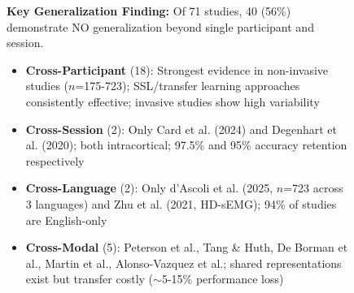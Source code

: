 \begin{figure}[h!]
\centering
{}

\vspace{1cm}

\centering
\footnotesize
\textbf{Key Generalization Finding:} Of 71 studies, 40 (56\%) demonstrate NO generalization beyond single participant and session.
\begin{itemize}
  \item \textbf{Cross-Participant} (18): Strongest evidence in non-invasive studies ($n$=175-723); SSL/transfer learning approaches consistently effective; invasive studies show high variability
  \item \textbf{Cross-Session} (2): Only Card et al. (2024) and Degenhart et al. (2020); both intracortical; 97.5\% and 95\% accuracy retention respectively
  \item \textbf{Cross-Language} (2): Only d'Ascoli et al. (2025, $n$=723 across 3 languages) and Zhu et al. (2021, HD-sEMG); 94\% of studies are English-only
  \item \textbf{Cross-Modal} (5): Peterson et al., Tang \& Huth, De Borman et al., Martin et al., Alonso-Vazquez et al.; shared representations exist but transfer costly ($\sim$5-15\% performance loss)
\end{itemize}


\end{figure}
